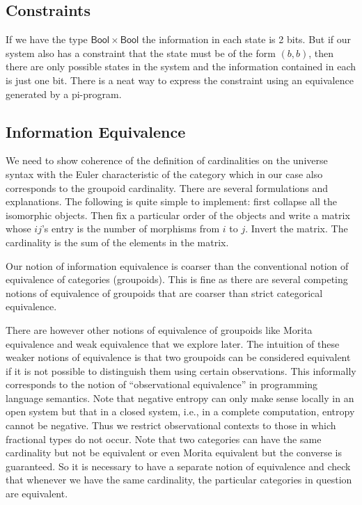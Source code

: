 \subsection{Constraints}

If we have the type $\mathsf{Bool} \times \mathsf{Bool}$ the
information in each state is 2 bits. But if our system also has a
constraint that the state must be of the form $(b,b)$, then there are
only possible states in the system and the information contained in
each is just one bit. There is a neat way to express the constraint
using an equivalence generated by a pi-program.
  
\subsection{Information Equivalence}
  
We need to show coherence of the definition of cardinalities on the
universe syntax with the Euler characteristic of the category which in
our case also corresponds to the groupoid cardinality. There are
several formulations and explanations. The following is quite simple
to implement: first collapse all the isomorphic objects. Then fix a
particular order of the objects and write a matrix whose $ij$'s entry
is the number of morphisms from $i$ to $j$. Invert the matrix. The
cardinality is the sum of the elements in the matrix.

Our notion of information equivalence is coarser than the conventional
notion of equivalence of categories (groupoids). This is fine as there
are several competing notions of equivalence of groupoids that are
coarser than strict categorical equivalence.

There are however other notions of equivalence of groupoids like
Morita equivalence and weak equivalence that we explore later. The
intuition of these weaker notions of equivalence is that two groupoids
can be considered equivalent if it is not possible to distinguish them
using certain observations. This informally corresponds to the notion
of ``observational equivalence'' in programming language
semantics. Note that negative entropy can only make sense locally in
an open system but that in a closed system, i.e., in a complete
computation, entropy cannot be negative. Thus we restrict
observational contexts to those in which fractional types do not
occur. Note that two categories can have the same cardinality but not
be equivalent or even Morita equivalent but the converse is
guaranteed. So it is necessary to have a separate notion of
equivalence and check that whenever we have the same cardinality, the
particular categories in question are equivalent.


